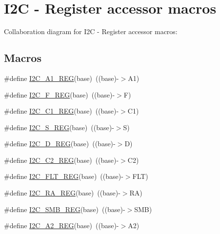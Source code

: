 \hypertarget{group___i2_c___register___accessor___macros}{}\section{I2C -\/ Register accessor macros}
\label{group___i2_c___register___accessor___macros}
Collaboration diagram for I2C -\/ Register accessor macros\+:
\subsection*{Macros}
\begin{DoxyCompactItemize}
\item 
\#define \hyperlink{group___i2_c___register___accessor___macros_gaa114fe991a3e1e899b53160c91bd8c72}{I2\+C\+\_\+\+A1\+\_\+\+R\+EG}(base)~((base)-\/$>$A1)
\item 
\#define \hyperlink{group___i2_c___register___accessor___macros_ga49a7294fe984b9468681113184d18dfc}{I2\+C\+\_\+\+F\+\_\+\+R\+EG}(base)~((base)-\/$>$F)
\item 
\#define \hyperlink{group___i2_c___register___accessor___macros_gab99b9e99fa2eda1aac30eff81842ce36}{I2\+C\+\_\+\+C1\+\_\+\+R\+EG}(base)~((base)-\/$>$C1)
\item 
\#define \hyperlink{group___i2_c___register___accessor___macros_gaba7d61b90ba883e4e9711a54e4526465}{I2\+C\+\_\+\+S\+\_\+\+R\+EG}(base)~((base)-\/$>$S)
\item 
\#define \hyperlink{group___i2_c___register___accessor___macros_ga0c6f62e67b1d2b8bc2eb7ed0e3a57fbd}{I2\+C\+\_\+\+D\+\_\+\+R\+EG}(base)~((base)-\/$>$D)
\item 
\#define \hyperlink{group___i2_c___register___accessor___macros_ga27c7ad30a1ae595f33d8644b381be049}{I2\+C\+\_\+\+C2\+\_\+\+R\+EG}(base)~((base)-\/$>$C2)
\item 
\#define \hyperlink{group___i2_c___register___accessor___macros_ga3eacf50cc16f3a822d765b681f781d90}{I2\+C\+\_\+\+F\+L\+T\+\_\+\+R\+EG}(base)~((base)-\/$>$F\+LT)
\item 
\#define \hyperlink{group___i2_c___register___accessor___macros_ga42d4bbf2df8f036a27d2092bd9eb6065}{I2\+C\+\_\+\+R\+A\+\_\+\+R\+EG}(base)~((base)-\/$>$RA)
\item 
\#define \hyperlink{group___i2_c___register___accessor___macros_ga320d358df195778429696e7755acc5e8}{I2\+C\+\_\+\+S\+M\+B\+\_\+\+R\+EG}(base)~((base)-\/$>$S\+MB)
\item 
\#define \hyperlink{group___i2_c___register___accessor___macros_ga654554108023356beab5b561b7787139}{I2\+C\+\_\+\+A2\+\_\+\+R\+EG}(base)~((base)-\/$>$A2)

\end{DoxyCompactItemize}
